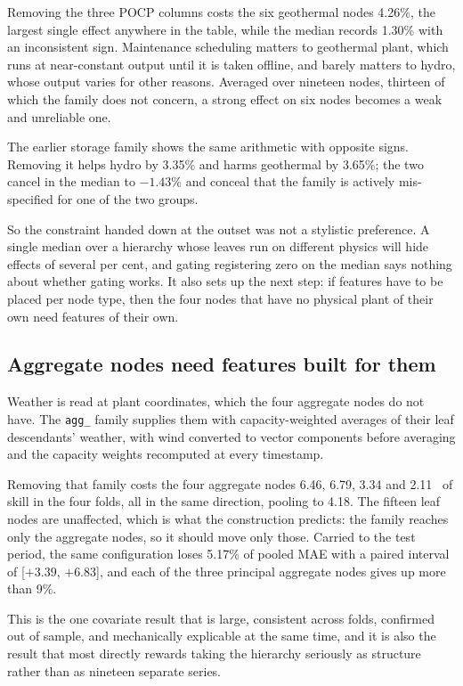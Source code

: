 Removing the three POCP columns costs the six geothermal nodes 4.26\%, the largest single
effect anywhere in the table, while the median records 1.30\% with an inconsistent sign.
Maintenance scheduling matters to geothermal plant, which runs at near-constant output until
it is taken offline, and barely matters to hydro, whose output varies for other reasons.
Averaged over nineteen nodes, thirteen of which the family does not concern, a strong effect
on six nodes becomes a weak and unreliable one.

The earlier storage family shows the same arithmetic with opposite signs. Removing it helps
hydro by 3.35\% and harms geothermal by 3.65\%; the two cancel in the median to $-1.43$\%
and conceal that the family is actively mis-specified for one of the two groups.

So the constraint handed down at the outset was not a stylistic preference. A single median
over a hierarchy whose leaves run on different physics will hide effects of several per
cent, and gating registering zero on the median says nothing about whether gating works.
It also sets up the next step: if features have to be placed per node type, then the four
nodes that have no physical plant of their own need features of their own.

\subsection{Aggregate nodes need features built for them}

Weather is read at plant coordinates, which the four aggregate nodes do not have. The
\verb+agg_+ family supplies them with capacity-weighted averages of their leaf descendants'
weather, with wind converted to vector components before averaging and the capacity weights
recomputed at every timestamp.

Removing that family costs the four aggregate nodes 6.46, 6.79, 3.34 and 2.11~\pp{} of
skill in the four folds, all in the same direction, pooling to 4.18. The fifteen leaf nodes
are unaffected, which is what the construction predicts: the family reaches only the
aggregate nodes, so it should move only those. Carried to the test period, the same
configuration loses 5.17\% of pooled MAE with a paired interval of [$+3.39$, $+6.83$], and
each of the three principal aggregate nodes gives up more than 9\%.

This is the one covariate result that is large, consistent across folds, confirmed out of
sample, and mechanically explicable at the same time, and it is also the result that most
directly rewards taking the hierarchy seriously as structure rather than as nineteen
separate series.

